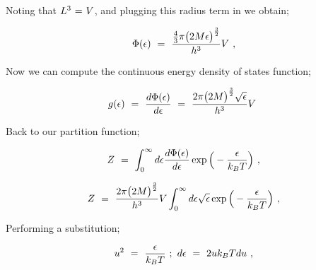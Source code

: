 \documentclass{article}
\begin{document}
Noting that \begin{math} L^3 \hspace{0.025cm} = \hspace{0.025cm} V \end{math}, and plugging this radius term in we obtain;

\begin{equation} \label{eb-eq-256-82}
\Phi ( \epsilon ) \hspace{0.125cm} = \hspace{0.125cm} \frac{ \frac{4}{3} \pi \big( 2 M \epsilon \big)^{\frac{3}{2}}}{h^3} V \hspace{0.125cm} , 
\end{equation}

Now we can compute the continuous energy density of states function;

\begin{equation} \label{eb-eq-256-83}
g ( \epsilon ) \hspace{0.125cm} = \hspace{0.125cm}  \frac{d  \Phi ( \epsilon )}{d \epsilon} \hspace{0.125cm} = \hspace{0.125cm} \frac{ 2 \pi \big( 2 M \big)^{\frac{3}{2}} \sqrt{\epsilon}}{h^3} V \hspace{0.125cm}
\end{equation}

Back to our partition function;

\begin{equation} \label{eb-eq-256-84}
Z \hspace{0.125cm} = \hspace{0.125cm} \int_{0}^{\infty} d \epsilon \frac{d  \Phi ( \epsilon )}{d \epsilon} \exp{\Big(-\frac{\epsilon}{k_B T} \Big)} \hspace{0.125cm} ,
\end{equation}

\begin{equation} \label{eb-eq-256-85}
Z \hspace{0.125cm} = \hspace{0.125cm} \frac{ 2 \pi \big( 2 M \big)^{\frac{3}{2}}}{h^3} V \int_{0}^{\infty} d \epsilon \sqrt{\epsilon} \exp{\Big(-\frac{\epsilon}{k_B T} \Big)} \hspace{0.125cm} ,
\end{equation}

Performing a substitution;

\begin{equation} \label{eb-eq-256-86}
u^2 \hspace{0.125cm} = \hspace{0.125cm} \frac{\epsilon}{k_B T} \hspace{0.125cm} ; \hspace{0.125cm} d \epsilon \hspace{0.125cm} = \hspace{0.125cm} 2 u k_B T d u \hspace{0.125cm} ,
\end{equation}
\end{document}
